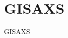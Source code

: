 \documentclass[\main/dresen_thesis.tex]{subfiles}
\begin{document}
  \section{GISAXS}
    \label{app:methods:gisaxs}
    GISAXS
\end{document}

